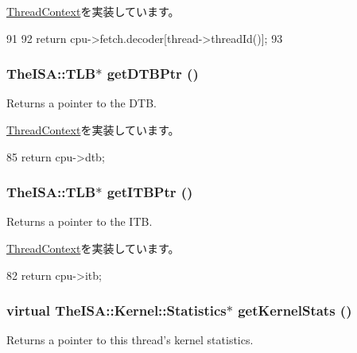 \hyperlink{classThreadContext_a14aa0e2adc88b9bc615f708aad02d80f}{ThreadContext}を実装しています。


\begin{DoxyCode}
91     {
92         return cpu->fetch.decoder[thread->threadId()];
93     }
\end{DoxyCode}
\hypertarget{classO3ThreadContext_a2fe6a07c44bc2a4d83b86bea605ba971}{
\subsubsection[{getDTBPtr}]{\setlength{\rightskip}{0pt plus 5cm}TheISA::TLB$\ast$ getDTBPtr ()}}
\label{classO3ThreadContext_a2fe6a07c44bc2a4d83b86bea605ba971}
Returns a pointer to the DTB. 

\hyperlink{classThreadContext_a235a0443e22590632cfc95cd4f6db1ae}{ThreadContext}を実装しています。


\begin{DoxyCode}
85 { return cpu->dtb; }
\end{DoxyCode}
\hypertarget{classO3ThreadContext_a95b7e95d0558cd03d69613142fff9137}{
\subsubsection[{getITBPtr}]{\setlength{\rightskip}{0pt plus 5cm}TheISA::TLB$\ast$ getITBPtr ()}}
\label{classO3ThreadContext_a95b7e95d0558cd03d69613142fff9137}
Returns a pointer to the ITB. 

\hyperlink{classThreadContext_aaae22e0dcf2f312619915bbf34509ba4}{ThreadContext}を実装しています。


\begin{DoxyCode}
82 { return cpu->itb; }
\end{DoxyCode}
\hypertarget{classO3ThreadContext_ab24a9f94beeda4c4a7bcf576a75be32a}{
\subsubsection[{getKernelStats}]{\setlength{\rightskip}{0pt plus 5cm}virtual TheISA::Kernel::Statistics$\ast$ getKernelStats ()}}
\label{classO3ThreadContext_ab24a9f94beeda4c4a7bcf576a75be32a}
Returns a pointer to this thread's kernel statistics. 

